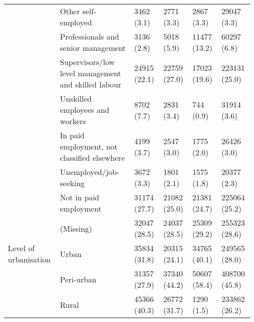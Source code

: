 \begin{tabular}{llllll}
 & Other self-employed & 3462 (3.1) & 2771 (3.3) & 2867 (3.3) & 29047 (3.3)\\
 & Professionals and senior management & 3136 (2.8) & 5018 (5.9) & 11477 (13.2) & 60297 (6.8)\\
 & Supervisors/low level management and skilled labour & 24915 (22.1) & 22759 (27.0) & 17023 (19.6) & 223131 (25.0)\\
 & Unskilled employees and workers & 8702 (7.7) & 2831 (3.4) & 744 (0.9) & 31914 (3.6)\\
 & In paid employment, not classified elsewhere & 4199 (3.7) & 2547 (3.0) & 1775 (2.0) & 26426 (3.0)\\
 & Unemployed/job-seeking & 3672 (3.3) & 1801 (2.1) & 1575 (1.8) & 20377 (2.3)\\
 & Not in paid employment & 31174 (27.7) & 21082 (25.0) & 21381 (24.7) & 225064 (25.2)\\
 & (Missing) & 32047 (28.5) & 24037 (28.5) & 25309 (29.2) & 255323 (28.6)\\
\addlinespace
Level of urbanisation & Urban & 35834 (31.8) & 20315 (24.1) & 34765 (40.1) & 249565 (28.0)\\
 & Peri-urban & 31357 (27.9) & 37340 (44.2) & 50607 (58.4) & 408700 (45.8)\\
 & Rural & 45366 (40.3) & 26772 (31.7) & 1290 (1.5) & 233862 (26.2)\\
\bottomrule
\end{tabular}